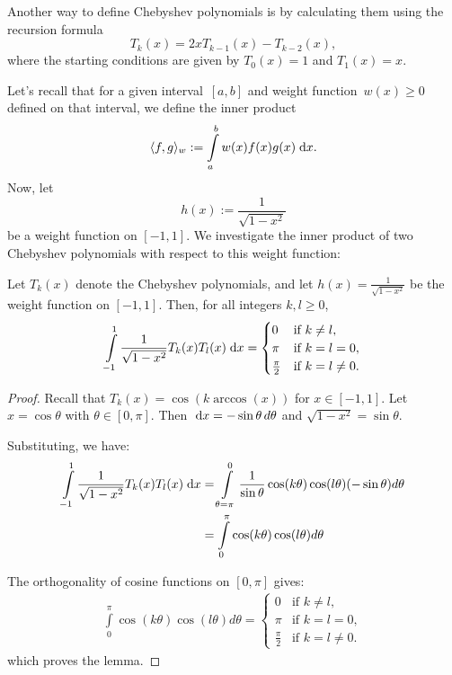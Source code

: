 Another way to define Chebyshev polynomials is by calculating them using the recursion formula
\[
T_{k}(x) = 2xT_{k - 1}(x) - T_{k - 2}(x),
\]
where the starting conditions are given by $T_0(x) = 1$ and $T_1(x) = x$.

Let's recall that for a given interval~$[a, b]$ and weight function~$w(x) \geq 0$ defined on that interval, we define the inner product
\[
\langle f, g \rangle_w := \int\limits_a^b w(x) f(x) g(x) \;\mathrm{d}x.
\]
Now, let
\[
h(x) := \frac{1}{\sqrt{1 - x^2}}
\]
be a weight function on $[-1, 1]$. We investigate the inner product of two Chebyshev polynomials with respect to this weight function:

\begin{lemma}
Let $T_k(x)$ denote the Chebyshev polynomials, and let $h(x) = \frac{1}{\sqrt{1 - x^2}}$ be the weight function on $[-1, 1]$. Then, for all integers $k, l \geq 0$,
\begin{equation} \label{eq:orthogonality}
    \int\limits_{-1}^1 \frac{1}{\sqrt{1 - x^2}} T_k(x) T_l(x) \;\mathrm{d}x =
    \begin{cases}
        0               & \text{if } k \neq l,\\
        \pi             & \text{if } k = l = 0,\\
        \frac{\pi}{2}   & \text{if } k = l \neq 0.
    \end{cases}
\end{equation}
\end{lemma}

\begin{proof}
Recall that $T_k(x) = \cos(k \arccos(x))$ for $x \in [-1, 1]$. Let $x = \cos \theta$ with $\theta \in [0, \pi]$. Then $\;\mathrm{d}x = -\sin \theta \, d\theta$ and $\sqrt{1 - x^2} = \sin \theta$.

Substituting, we have:
\begin{align*}
    \int\limits_{-1}^1 \frac{1}{\sqrt{1 - x^2}} T_k(x) T_l(x) \;\mathrm{d}x
    &= \int\limits_{\theta=\pi}^{0} \frac{1}{\sin \theta} \cos(k \theta) \cos(l \theta) (-\sin \theta) d\theta \\
    &= \int\limits_{0}^{\pi} \cos(k \theta) \cos(l \theta) d\theta
\end{align*}

The orthogonality of cosine functions on $[0, \pi]$ gives:
\begin{align*}
    \int\limits_{0}^{\pi} \cos(k \theta) \cos(l \theta) d\theta =
    \begin{cases}
        0               & \text{if } k \neq l,\\
        \pi             & \text{if } k = l = 0,\\
        \frac{\pi}{2}   & \text{if } k = l \neq 0.
    \end{cases}
\end{align*}
which proves the lemma.
\end{proof}

